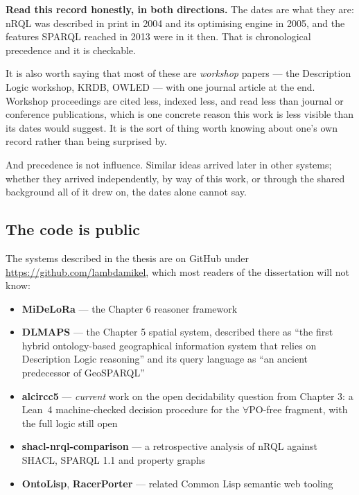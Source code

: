 \documentclass[11pt,a4paper,DIV=12,parskip=half]{scrartcl}
\newenvironment{note}
  {\begin{list}{}{\setlength{\leftmargin}{1.5em}\setlength{\rightmargin}{1.5em}%
                  \setlength{\listparindent}{0pt}}\item[]\small}
  {\end{list}}
\begin{document}
\begin{note}
\textbf{Read this record honestly, in both directions.} The dates are what they
are: nRQL was described in print in 2004 and its optimising engine in 2005, and
the features SPARQL reached in 2013 were in it then. That is chronological
precedence and it is checkable.

It is also worth saying that most of these are \emph{workshop} papers --- the
Description Logic workshop, KRDB, OWLED --- with one journal article at the end.
Workshop proceedings are cited less, indexed less, and read less than journal or
conference publications, which is one concrete reason this work is less visible
than its dates would suggest. It is the sort of thing worth knowing about one's
own record rather than being surprised by.

And precedence is not influence. Similar ideas arrived later in other systems;
whether they arrived independently, by way of this work, or through the shared
background all of it drew on, the dates alone cannot say.
\end{note}

\subsection{The code is public}

The systems described in the thesis are on GitHub under
\url{https://github.com/lambdamikel}, which most readers of the dissertation will
not know:

\begin{itemize}
\item \textbf{MiDeLoRa} --- the Chapter 6 reasoner framework
\item \textbf{DLMAPS} --- the Chapter 5 spatial system, described there as
  \enquote{the first hybrid ontology-based geographical information system that
  relies on Description Logic reasoning} and its query language as \enquote{an
  ancient predecessor of GeoSPARQL}
\item \textbf{alcircc5} --- \emph{current} work on the open decidability question
  from Chapter 3: a Lean~4 machine-checked decision procedure for the
  $\forall$PO-free fragment, with the full logic still open
\item \textbf{shacl-\allowbreak nrql-\allowbreak comparison} --- a retrospective analysis of nRQL against
  SHACL, SPARQL 1.1 and property graphs
\item \textbf{OntoLisp}, \textbf{RacerPorter} --- related Common Lisp semantic web
  tooling
\end{itemize}
\end{document}
